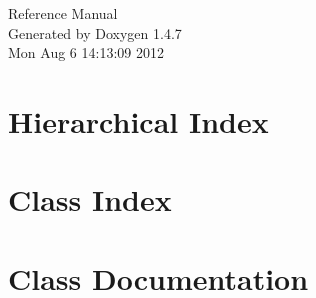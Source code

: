 \documentclass[a4paper]{book}
\begin{document}
\begin{titlepage}
\vspace*{7cm}
\begin{center}
{\Large Reference Manual}\\
\vspace*{1cm}
{\large Generated by Doxygen 1.4.7}\\
\vspace*{0.5cm}
{\small Mon Aug 6 14:13:09 2012}\\
\end{center}
\end{titlepage}
\clearemptydoublepage
{}
\tableofcontents
\clearemptydoublepage
{}
\chapter{Hierarchical Index}

\chapter{Class Index}

\chapter{Class Documentation}





























\printindex
\end{document}
